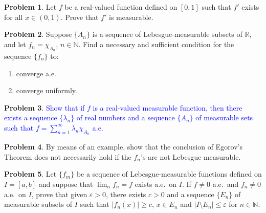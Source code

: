 \documentclass[12pt]{amsart}
\def\field#1{\mathbb{#1}}
\def\abs#1{\lvert {#1} \rvert}
\theoremstyle{definition}
\newtheorem{problem}{Problem}
\theoremstyle{remark}
\begin{document}
\begin{problem}
  Let $f$ be a real-valued function defined on $[0,1]$ such that $f'$
  exists for all $x \in (0,1)$.  Prove that $f'$ is measurable.
\end{problem}
\begin{problem}
  Suppose $\{ A_n \}$ is a sequence of Lebesgue-measurable subsets of
  $\field{R}$, and let $f_n = \chi_{A_n}$, $n \in \field{N}$.  Find a
  necessary and sufficient condition for the sequence $\{ f_n \}$ to:
  \begin{enumerate}
  \item converge a.e.
  \item converge uniformly.
  \end{enumerate}
\end{problem}
\begin{problem}
  \textcolor{blue}{Show that if $f$ is a real-valued measurable
  function, then there exists a sequence $\{ \lambda_n \}$ of real
  numbers and a sequence $\{ A_n \}$ of measurable sets such that $f =
  \sum_{n=1} ^\infty \lambda_n \chi_{A_n}$ a.e.}
\end{problem}
\begin{problem}
  By means of an example, show that the conclusion of Egorov's Theorem
  does not necessarily hold if the $f_n$'s are not Lebesgue
  measurable.
\end{problem}
\begin{problem}
  Let $\{ f_m\}$ be a sequence of Lebesgue-measurable functions
  defined on $I=[a,b]$ and suppose that $\lim_n f_n = f$ exists
  a.e.~on $I$.  If $f \neq 0$ a.e.~and $f_n \neq 0$ a.e.~on $I$, prove
  that given $\varepsilon > 0$, there exists $c>0$ and a sequence $\{
  E_n \}$ of measurable subsets of $I$ such that $\abs{ f_n (x) } \geq
  c$, $x \in E_n$ and $\abs{ I \setminus E_n } \leq \varepsilon$ for
  $n \in \field{N}$.
\end{problem}
\end{document}
